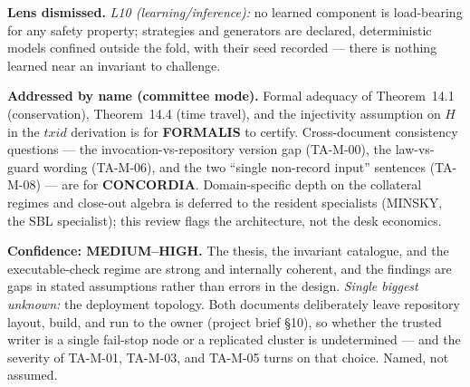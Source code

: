 \documentclass[11pt,a4paper]{article}
\begin{document}
\textbf{Lens dismissed.}
\emph{L10 (learning/inference):} no learned component is load-bearing for any safety property;
strategies and generators are declared, deterministic models confined outside the fold, with
their seed recorded --- there is nothing learned near an invariant to challenge.

\textbf{Addressed by name (committee mode).} Formal adequacy of Theorem~14.1 (conservation),
Theorem~14.4 (time travel), and the injectivity assumption on $H$ in the $\mathit{txid}$
derivation is for \textbf{FORMALIS} to certify. Cross-document consistency questions --- the
invocation-vs-repository version gap (TA-M-00), the law-vs-guard wording (TA-M-06), and the two
``single non-record input'' sentences (TA-M-08) --- are for \textbf{CONCORDIA}. Domain-specific
depth on the collateral regimes and close-out algebra is deferred to the resident specialists
(MINSKY, the SBL specialist); this review flags the architecture, not the desk economics.

\textbf{Confidence: MEDIUM--HIGH.} The thesis, the invariant catalogue, and the executable-check
regime are strong and internally coherent, and the findings are gaps in stated assumptions rather
than errors in the design. \emph{Single biggest unknown:} the deployment topology. Both documents
deliberately leave repository layout, build, and run to the owner (project brief §10), so whether
the trusted writer is a single fail-stop node or a replicated cluster is undetermined --- and the
severity of TA-M-01, TA-M-03, and TA-M-05 turns on that choice. Named, not assumed.
\end{document}
